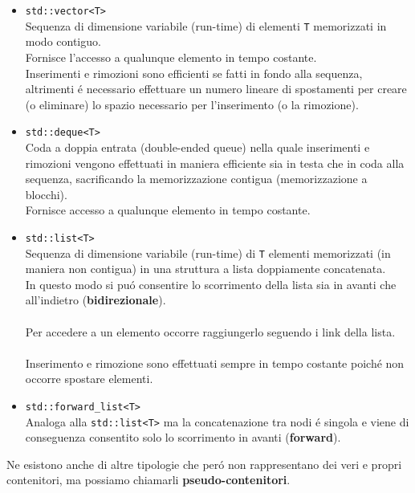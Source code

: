 \documentclass{article}
\begin{document}
\begin{itemize}	
\item \texttt{\textcolor{blu}{std::vector<T>}} \\ Sequenza di dimensione variabile (run-time) di elementi \texttt{T} memorizzati in modo contiguo.\\Fornisce l'accesso a qualunque elemento in tempo costante.\\Inserimenti e rimozioni sono efficienti se fatti in fondo alla sequenza, altrimenti \'e necessario effettuare un numero lineare di spostamenti per creare (o eliminare) lo spazio necessario per l'inserimento (o la rimozione). \\
\item \texttt{\textcolor{blu}{std::deque<T>}}\\ Coda a doppia entrata (double-ended queue) nella quale inserimenti e rimozioni vengono effettuati in maniera efficiente sia in testa che in coda alla sequenza, sacrificando la memorizzazione contigua (memorizzazione a blocchi).\\Fornisce accesso a qualunque elemento in tempo costante. \\
\item \texttt{\textcolor{blu}{std::list<T>}} \\ Sequenza di dimensione variabile (run-time) di \texttt{T} elementi memorizzati (in maniera non contigua) in una struttura a lista doppiamente concatenata.\\In questo modo si pu\'o consentire lo scorrimento della lista sia in avanti che all'indietro (\textbf{bidirezionale}).\\ \\Per accedere a un elemento occorre raggiungerlo seguendo i link della lista.\\ \\ Inserimento e rimozione sono effettuati sempre in tempo costante poich\'e non occorre spostare elementi. \\
\item \texttt{\textcolor{blu}{std::forward\_list<T>}} \\ Analoga alla \texttt{std::list<T>} ma la concatenazione tra nodi \'e singola e viene di conseguenza consentito solo lo scorrimento in avanti (\textbf{forward}). \\
\end{itemize}
Ne esistono anche di altre tipologie che per\'o non rappresentano dei veri e propri contenitori, ma possiamo chiamarli \textbf{pseudo-contenitori}. \\
\end{document}
